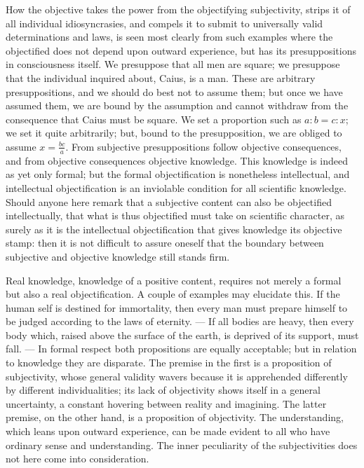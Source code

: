 \documentclass[12pt]{book}
\begin{document}
How the objective takes the power from the objectifying subjectivity, strips it
of all individual idiosyncrasies, and compels it to submit to universally valid
determinations and laws, is seen most clearly from such examples where the
objectified does not depend upon outward experience, but has its presuppositions
in consciousness itself. We presuppose that all men are square; we presuppose
that the individual inquired about, Caius, is a man. These are arbitrary
presuppositions, and we should do best not to assume them; but once we have
assumed them, we are bound by the assumption and cannot withdraw from the
consequence that Caius must be square. We set a proportion such as $a : b = c :
x$; we set it quite arbitrarily; but, bound to the presupposition, we are
obliged to assume $x = \frac{bc}{a}$. From subjective presuppositions follow
objective consequences, and from objective consequences objective knowledge.
This knowledge is indeed as yet only formal; but the formal objectification is
nonetheless intellectual, and intellectual objectification is an inviolable
condition for all scientific knowledge. Should anyone here remark that a
subjective content can also be objectified intellectually, that what is thus
objectified must take on scientific character, as surely as it is the
intellectual objectification that gives knowledge its objective stamp: then it
is not difficult to assure oneself that the boundary between subjective and
objective knowledge still stands firm.

Real knowledge, knowledge of a positive content, requires not merely a formal
but also a real objectification. A couple of examples may elucidate this. If
the human self is destined for immortality, then every man must prepare himself
to be judged according to the laws of eternity. --- If all bodies are heavy,
then every body which, raised above the surface of the earth, is deprived of
its support, must fall. --- In formal respect both propositions are equally
acceptable; but in relation to knowledge they are disparate. The premise in the
first is a proposition of subjectivity, whose general validity wavers because it
is apprehended differently by different individualities; its lack of objectivity
shows itself in a general uncertainty, a constant hovering between reality and
imagining. The latter premise, on the other hand, is a proposition of
objectivity. The understanding, which leans upon outward experience, can be made
evident to all who have ordinary sense and understanding. The inner peculiarity
of the subjectivities does not here come into consideration.
\end{document}
